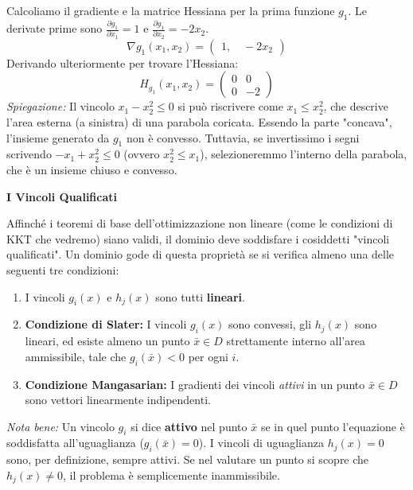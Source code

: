 \documentclass[12pt, a4paper]{article}
\newcommand{\separatore}{\noindent{\color{titlecolor!50}\rule{\textwidth}{0.6pt}}}
\begin{document}
	Calcoliamo il gradiente e la matrice Hessiana per la prima funzione $g_1$. Le derivate prime sono $\frac{\partial g_1}{\partial x_1} = 1$ e $\frac{\partial g_1}{\partial x_2} = -2x_2$.
	\[
	\nabla g_1(x_1, x_2) = \begin{pmatrix} 1, \quad -2x_2 \end{pmatrix}
	\]
	Derivando ulteriormente per trovare l'Hessiana:
	\[
	H_{g_1}(x_1, x_2) = \begin{pmatrix} 0 & 0 \\ 0 & -2 \end{pmatrix}
	\]
	\textit{Spiegazione:} Il vincolo $x_1 - x_2^2 \le 0$ si può riscrivere come $x_1 \le x_2^2$, che descrive l'area esterna (a sinistra) di una parabola coricata. Essendo la parte "concava", l'insieme generato da $g_1$ non è convesso.
	Tuttavia, se invertissimo i segni scrivendo $-x_1 + x_2^2 \le 0$ (ovvero $x_2^2 \le x_1$), selezioneremmo l'interno della parabola, che è un insieme chiuso e convesso.
	
	\vspace{0.4cm}
	\textbf{I Vincoli Qualificati}
	
	Affinché i teoremi di base dell'ottimizzazione non lineare (come le condizioni di KKT che vedremo) siano validi, il dominio deve soddisfare i cosiddetti "vincoli qualificati". Un dominio gode di questa proprietà se si verifica almeno una delle seguenti tre condizioni:
	\begin{enumerate}
		\item I vincoli $g_i(x)$ e $h_j(x)$ sono tutti \textbf{lineari}.
		\item \textbf{Condizione di Slater:} I vincoli $g_i(x)$ sono convessi, gli $h_j(x)$ sono lineari, ed esiste almeno un punto $\bar{x} \in D$ strettamente interno all'area ammissibile, tale che $g_i(\bar{x}) < 0$ per ogni $i$.
		\item \textbf{Condizione Mangasarian:} I gradienti dei vincoli \textit{attivi} in un punto $\bar{x} \in D$ sono vettori linearmente indipendenti.
	\end{enumerate}
	\textit{Nota bene:} Un vincolo $g_i$ si dice \textbf{attivo} nel punto $\bar{x}$ se in quel punto l'equazione è soddisfatta all'uguaglianza ($g_i(\bar{x}) = 0$). I vincoli di uguaglianza $h_j(x) = 0$ sono, per definizione, sempre attivi. Se nel valutare un punto si scopre che $h_j(x) \neq 0$, il problema è semplicemente inammissibile.
	
	\vspace{0.6cm}
	\separatore
	\vspace{0.4cm}
	
\end{document}
